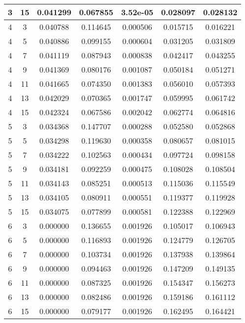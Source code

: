 \begin{longtable}{|c|c|c|c|c|c|c|}
	\hline 3 &	15 &	0.041299 &	0.067855 &	3.52e-05 &	0.028097 &	0.028132 \\
	\hline \rowcolor{closest} 4 &	3 &	0.040788 &	0.114645 &	0.000506 &	0.015715 &	0.016221 \\
	\hline 4 &	5 &	0.040886 &	0.099155 &	0.000604 &	0.031205 &	0.031809 \\
	\hline 4 &	7 &	0.041119 &	0.087943 &	0.000838 &	0.042417 &	0.043255 \\
	\hline 4 &	9 &	0.041369 &	0.080176 &	0.001087 &	0.050184 &	0.051271 \\
	\hline 4 &	11 &	0.041665 &	0.074350 &	0.001383 &	0.056010 &	0.057393 \\
	\hline 4 &	13 &	0.042029 &	0.070365 &	0.001747 &	0.059995 &	0.061742 \\
	\hline 4 &	15 &	0.042324 &	0.067586 &	0.002042 &	0.062774 &	0.064816 \\
	\hline \rowcolor{closest} 5 &	3 &	0.034368 &	0.147707 &	0.000288 &	0.052580 &	0.052868 \\
	\hline 5 &	5 &	0.034298 &	0.119630 &	0.000358 &	0.080657 &	0.081015 \\
	\hline 5 &	7 &	0.034222 &	0.102563 &	0.000434 &	0.097724 &	0.098158 \\
	\hline 5 &	9 &	0.034181 &	0.092259 &	0.000475 &	0.108028 &	0.108504 \\
	\hline 5 &	11 &	0.034143 &	0.085251 &	0.000513 &	0.115036 &	0.115549 \\
	\hline 5 &	13 &	0.034105 &	0.080911 &	0.000551 &	0.119377 &	0.119928 \\
	\hline 5 &	15 &	0.034075 &	0.077899 &	0.000581 &	0.122388 &	0.122969 \\
	\hline \rowcolor{closest} 6 &	3 &	0.000000 &	0.136655 &	0.001926 &	0.105017 &	0.106943 \\
	\hline 6 &	5 &	0.000000 &	0.116893 &	0.001926 &	0.124779 &	0.126705 \\
	\hline 6 &	7 &	0.000000 &	0.103734 &	0.001926 &	0.137938 &	0.139864 \\
	\hline 6 &	9 &	0.000000 &	0.094463 &	0.001926 &	0.147209 &	0.149135 \\
	\hline 6 &	11 &	0.000000 &	0.087325 &	0.001926 &	0.154347 &	0.156273 \\
	\hline 6 &	13 &	0.000000 &	0.082486 &	0.001926 &	0.159186 &	0.161112 \\
	\hline 6 &	15 &	0.000000 &	0.079177 &	0.001926 &	0.162495 &	0.164421 \\
	\hline 
\end{longtable} 


